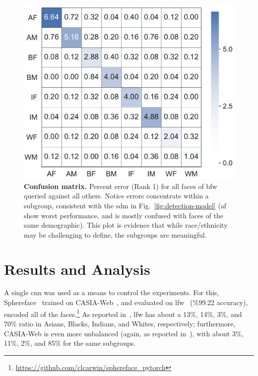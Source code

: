 \begin{figure}[t!]
	\centering    
	\includegraphics[width=\linewidth]{figures/confusion.pdf}
		\caption{\small{\textbf{Confusion matrix.} Percent error (Rank 1) for all faces of \gls{bfw} queried against all others. Notice errors concentrate within a subgroup, consistent with the \gls{sdm} in Fig.~\ref{fig:detection-model} (\ie \gls{af} show worst performance, and is mostly confused with faces of the same demographic). This plot is evidence that while race/ethnicity may be challenging to define, the subgroups are meaningful.}}
		\label{fig:confusion} 
\end{figure} 

\section{Results and Analysis}
A single \gls{cnn} was used as a means to control the experiments. For this, Sphereface~\cite{liu2017sphereface} trained on CASIA-Web~\cite{yi2014learning}, and evaluated on \gls{lfw}~\cite{LFWTech} (\%99.22 accuracy), encoded all of the faces.\footnote{\href{$https://github.com/clcarwin/sphereface\_pytorch$}{https://github.com/clcarwin/sphereface\_pytorch}} As reported in~\cite{wang2019racial}, \gls{lfw} has about a 13\%, 14\%, 3\%, and 70\% ratio in Asians, Blacks, Indians, and Whites, respectively; furthermore, CASIA-Web is even more unbalanced (again, as reported in~\cite{wang2019racial}), with about  3\%, 11\%, 2\%, and 85\% for the same subgroups.

